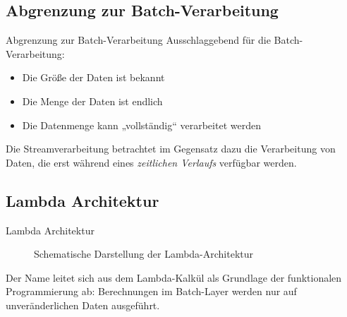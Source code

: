 \documentclass{beamer}
\begin{document}
\subsection{Abgrenzung zur Batch-Verarbeitung}

\begin{frame}[t]{Abgrenzung zur Batch-Verarbeitung}
  Ausschlaggebend für die Batch-Verarbeitung:
  \begin{itemize}
    \item Die Größe der Daten ist bekannt
    \item Die Menge der Daten ist endlich
    \item Die Datenmenge kann „vollständig“ verarbeitet werden
  \end{itemize}
  Die Streamverarbeitung betrachtet im Gegensatz dazu die Verarbeitung
  von Daten, die erst während eines \textit{zeitlichen Verlaufs} verfügbar
  werden.

\end{frame}


\subsection{Lambda Architektur}
\begin{frame}[t]{Lambda Architektur}
  \begin{figure}[h]
    \center
    \scalebox{.4}{}
    \caption{Schematische Darstellung der Lambda-Architektur}
    \label{fig:lambdaarch}
  \end{figure}
  Der Name leitet sich aus dem Lambda-Kalkül als Grundlage der
  funktionalen Programmierung ab: Berechnungen im Batch-Layer werden
  nur auf unveränderlichen Daten ausgeführt.
\end{frame}
\end{document}
